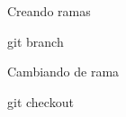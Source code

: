 \begin{frame}[t]{Creando ramas}
    \begin{comando}
        git branch
    \end{comando}

\end{frame}

\begin{frame}[t]{Cambiando de rama}
    \begin{comando}
        git checkout
    \end{comando}


\end{frame}

